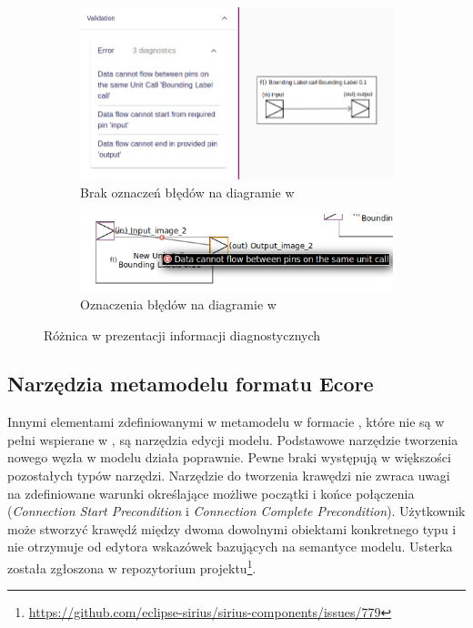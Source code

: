 \begin{figure}[t]
	\centering
	\begin{subfigure}{.49\textwidth}
		\centering
		\includegraphics[width=.99\linewidth]{./images/sirius-web-semantic-validation-direction-and-no-loops-rules.png}
		\caption{Brak oznaczeń błędów na diagramie w \SiriusWeb{}}\label{rys:validation-comparison-sirius-web}
	\end{subfigure}
  \begin{subfigure}{.49\textwidth}
		\centering
		\includegraphics[width=.99\linewidth]{./images/sirius-desktop-example-semantic-validation-rule-failure.png}
		\caption{Oznaczenia błędów na diagramie w \SiriusDesktop{}}\label{rys:validation-comparison-sirius-desktop}
	\end{subfigure}

	\caption{Różnica w prezentacji informacji diagnostycznych}
\end{figure}

\subsection{Narzędzia metamodelu formatu Ecore}

Innymi elementami zdefiniowanymi w metamodelu w formacie \Ecore{}, które nie są
w pełni
wspierane w \SiriusWeb{}, są narzędzia edycji modelu. Podstawowe narzędzie
tworzenia nowego węzła w modelu działa poprawnie.
Pewne braki występują w większości pozostałych typów narzędzi. Narzędzie do
tworzenia krawędzi nie zwraca uwagi na zdefiniowane warunki określające możliwe
początki i końce połączenia (\emph{Connection Start Precondition} i
\emph{Connection Complete Precondition}). Użytkownik może stworzyć krawędź
między dwoma dowolnymi obiektami konkretnego typu i nie otrzymuje od edytora
wskazówek bazujących na semantyce modelu. Usterka została zgłoszona w
repozytorium projektu\footnote{
	\url{https://github.com/eclipse-sirius/sirius-components/issues/779}}.

